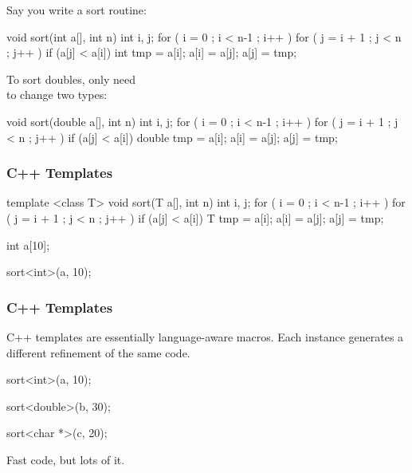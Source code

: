 \documentclass{plt}
\begin{document}
\begin{frame}[fragile]

Say you write a sort routine:

\begin{C}
void sort(int a[], int n)
{
  int i, j;
  for ( i = 0 ; i < n-1 ; i++ )
    for ( j = i + 1 ; j < n ; j++ )
      if (a[j] < a[i]) {
        int tmp = a[i];
        a[i] = a[j];
        a[j] = tmp;
      }
}
\end{C}

\end{frame}

\begin{frame}[fragile]

To sort doubles, only need \\
to change two types:

\begin{C}
void sort(double a[], int n)
{
  int i, j;
  for ( i = 0 ; i < n-1 ; i++ )
    for ( j = i + 1 ; j < n ; j++ )
      if (a[j] < a[i]) {
        double tmp = a[i];
        a[i] = a[j];
        a[j] = tmp;
      }
}
\end{C}

\end{frame}

\begin{frame}[fragile]
  \frametitle{C++ Templates}

\begin{cpp}
template <class T> void sort(T a[], int n)
{
  int i, j;
  for ( i = 0 ; i < n-1 ; i++ )
    for ( j = i + 1 ; j < n ; j++ )
      if (a[j] < a[i]) {
        T tmp = a[i];
        a[i] = a[j];
        a[j] = tmp;
      }
}

int a[10];

sort<int>(a, 10);
\end{cpp}

\end{frame}

\begin{frame}[fragile]
  \frametitle{C++ Templates}

C++ templates are essentially language-aware macros.  Each instance
generates a different refinement of the same code.

\begin{cpp}
sort<int>(a, 10);

sort<double>(b, 30);

sort<char *>(c, 20);
\end{cpp}

Fast code, but lots of it.

\end{frame}
\end{document}
